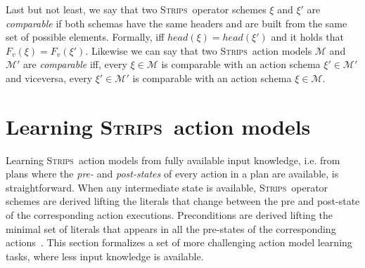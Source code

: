 \documentclass[3p,times]{elsarticle}
\newcommand{\strips}{\textsc{Strips}}     %
\begin{document}
Last but not least, we say that two \strips\ operator schemes $\xi$ and $\xi'$ are {\em comparable} if both schemas have the same headers and are built from the same set of possible elements. Formally, iff $head(\xi)=head(\xi')$ and it holds that $F_v(\xi)=F_v(\xi')$. Likewise we can say that two \strips\ action models $\mathcal{M}$ and $\mathcal{M}'$ are {\em comparable} iff, every $\xi\in\mathcal{M}$ is comparable with an action schema $\xi'\in\mathcal{M'}$ and viceversa, every $\xi'\in\mathcal{M'}$ is comparable with an action schema $\xi\in\mathcal{M}$.



\section{Learning \strips\ action models}
\label{sec:Section4}
Learning \strips\ action models from fully available input knowledge, i.e. from plans where the {\em pre-} and {\em post-states} of every action in a plan are available, is straightforward. When any intermediate state is available, \strips\ operator schemes are derived lifting the literals that change between the pre and post-state of the corresponding action executions. Preconditions are derived lifting the minimal set of literals that appears in all the pre-states of the corresponding actions~\cite{jimenez2012review}. This section formalizes a set of more challenging action model learning tasks, where less input knowledge is available.
\end{document}
